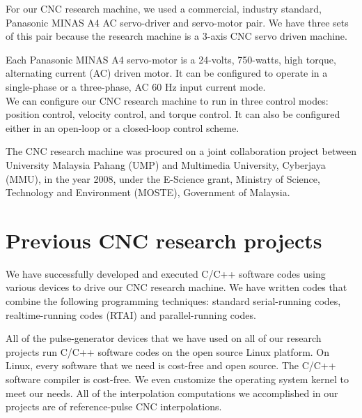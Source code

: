 For our CNC research machine, we used a commercial, industry standard, Panasonic MINAS A4 AC servo-driver and servo-motor pair. We have three sets of this pair because the research machine is a 3-axis CNC servo driven machine. 
\vspace*{1\baselineskip}

Each Panasonic MINAS A4 servo-motor is a 24-volts, 750-watts, high torque, alternating current (AC) driven motor. It can be configured to operate in a single-phase or a three-phase, AC 60 Hz input current mode.
\vspace*{2\baselineskip}\\

We can configure our CNC research machine to run in three control modes: position control, velocity control, and torque control. It can also be configured either in an open-loop or a closed-loop control scheme.  
\vspace*{1\baselineskip}

The CNC research machine was procured on a joint collaboration project between University Malaysia Pahang (UMP) and Multimedia University, Cyberjaya (MMU), in the year 2008, under the E-Science grant, Ministry of Science, Technology and Environment (MOSTE), Government of Malaysia.  


\section{Previous CNC research projects}

We have successfully developed and executed C/C++ software codes using various devices to drive our CNC research machine. We have written codes that combine the following programming techniques: standard serial-running codes, realtime-running codes (RTAI) and parallel-running codes.  
\vspace*{1\baselineskip}

All of the pulse-generator devices that we have used on all of our research projects run C/C++ software codes on the open source Linux platform. On Linux, every software that we need is cost-free and open source. The C/C++ software compiler is cost-free. We even customize the operating system kernel to meet our needs. All of the interpolation computations we accomplished in our projects are of reference-pulse CNC interpolations. 
\vspace*{1\baselineskip}

